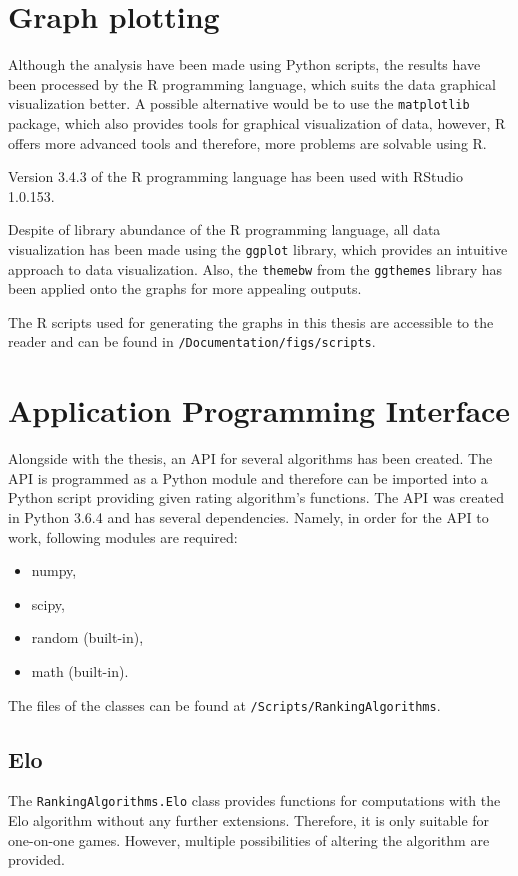 \section{Graph plotting}
Although the analysis have been made using Python scripts, the results have been processed by the R programming language, which suits the data graphical visualization better. A possible alternative would be to use the \texttt{matplotlib} package, which also provides tools for graphical visualization of data, however, R offers more advanced tools and therefore, more problems are solvable using R. 

Version 3.4.3 of the R programming language has been used with RStudio 1.0.153.

Despite of library abundance of the R programming language, all data visualization has been made using the \texttt{ggplot} library, which provides an intuitive approach to data visualization. Also, the \texttt{theme\textunderscore bw} from the \texttt{ggthemes} library has been applied onto the graphs for more appealing outputs.

The R scripts used for generating the graphs in this thesis are accessible to the reader and can be found in \texttt{/Documentation/figs/scripts}.

\section{Application Programming Interface}
Alongside with the thesis, an API for several algorithms has been created. The API is programmed as a Python module and therefore can be imported into a Python script providing given rating algorithm's functions. The API was created in Python 3.6.4 and has several dependencies. Namely, in order for the API to work, following modules are required:

\begin{itemize}
\item numpy,
\item scipy,
\item random (built-in),
\item math (built-in).
\end{itemize}
 
The files of the classes can be found at \texttt{/Scripts/RankingAlgorithms}.
\subsection{Elo}
The \texttt{RankingAlgorithms.Elo} class provides functions for computations with the Elo algorithm without any further extensions. Therefore, it is only suitable for one-on-one games. However, multiple possibilities of altering the algorithm are provided.

